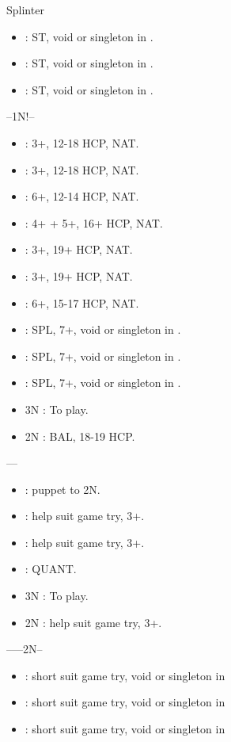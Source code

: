 \documentclass[12pt,twoside,a5paper]{report}%
\begin{document}
	Splinter
	\begin{itemize}
	\renewcommand{\labelitemi}{}
	\item {} : ST, void or singleton in \cl{}.
	\item {} : ST, void or singleton in \di{}.
	\item {} : ST, void or singleton in \sp{}.
	\end{itemize}

	--1N!--
	\begin{itemize}
	\renewcommand{\labelitemi}{}
	\item {} : 3+\cl{}, 12-18 HCP, NAT.
	\item {} : 3+\di{}, 12-18 HCP, NAT.
	\item {} : 6+\he{}, 12-14 HCP, NAT.
	\item {} : 4+\sp{} + 5+\he{}, 16+ HCP, NAT.
	\item {} : 3+\cl{}, 19+ HCP, NAT.
	\item {} : 3+\di{}, 19+ HCP, NAT.
	\item {} : 6+\he{}, 15-17 HCP, NAT.
	\item {} : SPL, 7+\he{}, void or singleton in \sp{}. 
	\item {} : SPL, 7+\he{}, void or singleton in \cl{}.
	\item {} : SPL, 7+\he{}, void or singleton in \di{}.
	\item 3N : To play.
	\item 2N : BAL, 18-19 HCP.
	\end{itemize}

	----
	\begin{itemize}
	\renewcommand{\labelitemi}{}
	\item {} : puppet to 2N.
	\item {} : help suit game try, 3+\cl{}.
	\item {} : help suit game try, 3+\di{}.
	\item {} : QUANT.
	\item 3N : To play.
	\item 2N : help suit game try, 3+\sp{}. 
	\end{itemize}

	------2N--
	\begin{itemize}
	\renewcommand{\labelitemi}{}
	\item {} : short suit game try, void or singleton in \cl{}
	\item {} : short suit game try, void or singleton in \di{}
	\item {} : short suit game try, void or singleton in \sp{}
	\end{itemize}
\end{document}
